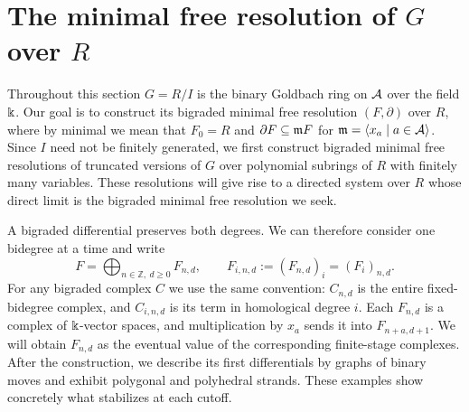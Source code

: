 \section{The minimal free resolution of \texorpdfstring{$G$}{G} over \texorpdfstring{$R$}{R}}
\label{setup:resolution-construction}
Throughout this section $G=R/I$ is the binary Goldbach ring on
$\mathcal A$ over the field $\Bbbk$.
Our goal is to construct its bigraded minimal free resolution $(F,\partial)$
over $R$, where by minimal we mean that $F_0=R$ and
$\partial F\subseteq\mathfrak m F$ for $\mathfrak m=\langle x_a\mid a\in\mathcal A\rangle$.
Since $I$ need not be finitely generated, we first construct bigraded
minimal free resolutions of truncated versions of $G$ over polynomial
subrings of $R$ with finitely many variables. These resolutions will
give rise to a directed system over $R$ whose direct limit is the
bigraded minimal free resolution we seek.

A bigraded differential preserves both degrees. We can therefore consider
one bidegree at a time and write
\begin{equation}\label{setup:strand-decomposition}
 F=\bigoplus_{n\in\mathbb Z,\ d\ge0}F_{n,d},
 \qquad F_{i,n,d}:=(F_{n,d})_i=(F_i)_{n,d}.
\end{equation}
For any bigraded complex $C$ we use the same convention: $C_{n,d}$
is the entire fixed-bidegree complex, and $C_{i,n,d}$ is its term
in homological degree $i$.
Each $F_{n,d}$ is a complex of $\Bbbk$-vector spaces, and multiplication
by $x_a$ sends it into $F_{n+a,d+1}$. We will obtain $F_{n,d}$ as the
eventual value of the corresponding finite-stage complexes. After
the construction, we describe its first differentials by graphs of
binary moves and exhibit polygonal and polyhedral strands. These
examples show concretely what stabilizes at each cutoff.

